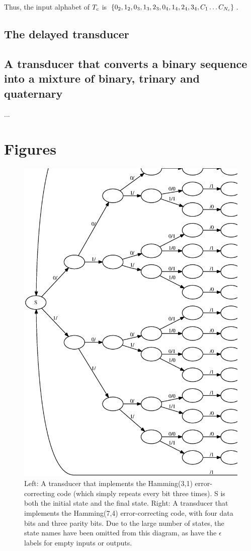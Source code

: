 \documentclass[english]{article}
\begin{document}
Thus, the input alphabet of $T_c$
is $\{ 0_2, 1_2,
       0_3, 1_3, 2_3,
       0_4, 1_4, 2_4, 3_4,
       C_{1} \ldots C_{N_c} \}$.

\subsection*{The delayed transducer}

\subsection*{A transducer that converts a binary sequence into a mixture of binary, trinary and quaternary}

...

\newpage
\section*{Figures}

\newpage
\begin{figure}
\includegraphics[width=.5\textwidth]{hamming74.ps}
\caption{ 
Left:
A transducer that implements the Hamming(3,1) error-correcting code
(which simply repeats every bit three times).
S is both the initial state and the final state.
Right:
A transducer that implements the Hamming(7,4) error-correcting code,
with four data bits and three parity bits.
Due to the large number of states, the state names have been omitted from this diagram,
as have the $\epsilon$ labels for empty inputs or outputs.
}
\end{figure}
\end{document}
